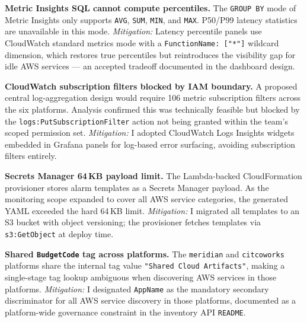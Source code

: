 \textbf{Metric Insights SQL cannot compute percentiles.} The
\texttt{GROUP BY} mode of Metric Insights only supports \texttt{AVG},
\texttt{SUM}, \texttt{MIN}, and \texttt{MAX}. P50/P99 latency statistics
are unavailable in this mode. \textit{Mitigation:} Latency percentile
panels use CloudWatch standard metrics mode with a
\texttt{FunctionName:~["*"]} wildcard dimension, which restores true
percentiles but reintroduces the visibility gap for idle AWS services ---
an accepted tradeoff documented in the dashboard design.

\textbf{CloudWatch subscription filters blocked by IAM boundary.}
A proposed central log-aggregation design would require 106 metric
subscription filters across the six platforms. Analysis confirmed this
was technically feasible but blocked by the
\texttt{logs:PutSubscriptionFilter} action not being granted within the
team's scoped permission set. \textit{Mitigation:} I adopted CloudWatch
Logs Insights widgets embedded in Grafana panels for log-based error
surfacing, avoiding subscription filters entirely.

\textbf{Secrets Manager 64\,KB payload limit.} The Lambda-backed
CloudFormation provisioner stores alarm templates as a Secrets Manager
payload. As the monitoring scope expanded to cover all AWS service
categories, the generated YAML exceeded the hard 64\,KB limit.
\textit{Mitigation:} I migrated all templates to an S3 bucket with
object versioning; the provisioner fetches templates via
\texttt{s3:GetObject} at deploy time.

\textbf{Shared \texttt{BudgetCode} tag across platforms.} The
\texttt{meridian} and \texttt{citcoworks} platforms share the internal
tag value \texttt{"Shared Cloud Artifacts"}, making a single-stage tag
lookup ambiguous when discovering AWS services in those platforms.
\textit{Mitigation:} I designated \texttt{AppName} as the mandatory
secondary discriminator for all AWS service discovery in those platforms,
documented as a platform-wide governance constraint in the inventory API
\texttt{README}.

